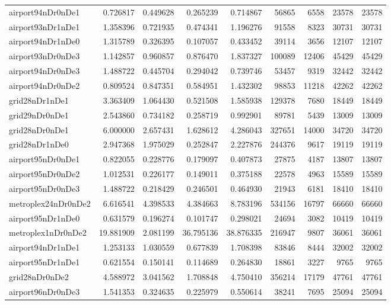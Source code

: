 \begin{longtable}{|l|r|r|r|r|r|r|r|r|}
airport94nDr0nDe1 & 0.726817 & 0.449628 & 0.265239 & 0.714867 & 56865 & 6558 & 23578 & 23578 \\
airport93nDr1nDe1 & 1.358396 & 0.721935 & 0.474341 & 1.196276 & 91558 & 8323 & 30731 & 30731 \\
airport94nDr1nDe0 & 1.315789 & 0.326395 & 0.107057 & 0.433452 & 39114 & 3656 & 12107 & 12107 \\
airport93nDr0nDe3 & 1.142857 & 0.960857 & 0.876470 & 1.837327 & 100089 & 12406 & 45429 & 45429 \\
airport94nDr0nDe3 & 1.488722 & 0.445704 & 0.294042 & 0.739746 & 53457 & 9319 & 32442 & 32442 \\
airport94nDr0nDe2 & 0.809524 & 0.847351 & 0.584951 & 1.432302 & 98853 & 11218 & 42262 & 42262 \\
grid28nDr1nDe1 & 3.363409 & 1.064430 & 0.521508 & 1.585938 & 129378 & 7680 & 18449 & 18449 \\
grid29nDr0nDe1 & 2.543860 & 0.734182 & 0.258719 & 0.992901 & 89781 & 5439 & 13009 & 13009 \\
grid28nDr0nDe1 & 6.000000 & 2.657431 & 1.628612 & 4.286043 & 327651 & 14000 & 34720 & 34720 \\
grid28nDr1nDe0 & 2.947368 & 1.975029 & 0.252847 & 2.227876 & 244376 & 9617 & 19119 & 19119 \\
airport95nDr0nDe1 & 0.822055 & 0.228776 & 0.179097 & 0.407873 & 27875 & 4187 & 13807 & 13807 \\
airport95nDr0nDe2 & 1.012531 & 0.226177 & 0.149011 & 0.375188 & 22578 & 4963 & 15589 & 15589 \\
airport95nDr0nDe3 & 1.488722 & 0.218429 & 0.246501 & 0.464930 & 21943 & 6181 & 18410 & 18410 \\
metroplex24nDr0nDe2 & 6.616541 & 4.398533 & 4.384663 & 8.783196 & 534156 & 16797 & 66660 & 66660 \\
airport95nDr1nDe0 & 0.631579 & 0.196274 & 0.101747 & 0.298021 & 24694 & 3082 & 10419 & 10419 \\
metroplex1nDr0nDe2 & 19.881909 & 2.081199 & 36.795136 & 38.876335 & 216947 & 9807 & 36061 & 36061 \\
airport94nDr1nDe1 & 1.253133 & 1.030559 & 0.677839 & 1.708398 & 83846 & 8444 & 32002 & 32002 \\
airport95nDr1nDe1 & 0.621554 & 0.150141 & 0.114689 & 0.264830 & 18861 & 3227 & 9765 & 9765 \\
grid28nDr0nDe2 & 4.588972 & 3.041562 & 1.708848 & 4.750410 & 356214 & 17179 & 47761 & 47761 \\
airport96nDr0nDe3 & 1.541353 & 0.324635 & 0.225979 & 0.550614 & 38241 & 7695 & 25094 & 25094 \\

\end{longtable}
